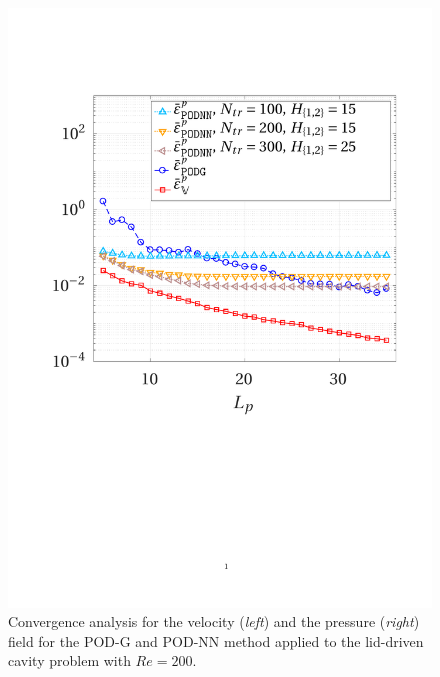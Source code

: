 \documentclass[12pt, a4paper, twoside, openright]{report}
\numberwithin{equation}{chapter}
\theoremstyle{theorem}
\theoremstyle{definition}
\theoremstyle{remark}
\theoremstyle{proposition}
\numberwithin{figure}{chapter}
\begin{document}
\begin{figure}[H]
			\includegraphics[scale = 0.44, trim = {2cm 9cm 1.5cm 3.5cm}, clip]{dc_200_p_error_vs_rank}
			
			\caption{Convergence analysis for the velocity (\emph{left}) and the pressure (\emph{right}) field for the POD-G and POD-NN method applied to the lid-driven cavity problem with $Re = 200$.}
			\label{}
		\end{figure}
		
\end{document}
